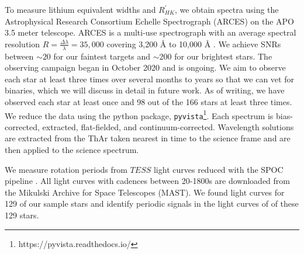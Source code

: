 
To measure lithium equivalent widths and $R^{'}_{HK}$, we obtain spectra using the Astrophysical Research Consortium Echelle Spectrograph (ARCES) on the APO 3.5 meter telescope. ARCES is a multi-use spectrograph with an average spectral resolution $R = \frac{\Delta\lambda}{\lambda} = 35,000$ covering 3,200 \r{A} to 10,000 \r{A} \citep{2003SPIE.4841.1145W}. We achieve SNRs between $\sim20$ for our faintest targets and $\sim200$ for our brightest stars.
The observing campaign began in October 2020 and is ongoing. We aim to observe each star at least three times over several months to years so that we can vet for binaries, which we will discuss in detail in future work. As of writing, we have observed each star at least once and 98 out of the 166 stars at least three times. We reduce the data using the python package, \texttt{pyvista}\footnote{https://pyvista.readthedocs.io/}. Each spectrum is bias-corrected, extracted, flat-fielded, and continuum-corrected. Wavelength solutions are extracted from the ThAr taken nearest in time to the science frame and are then applied to the science spectrum.  

We measure rotation periods from $TESS$ light curves reduced with the SPOC pipeline  \citep{2016SPIE.9913E..3EJ}. All light curves with cadences between 20-1800s are downloaded from the Mikulski Archive for Space Telescopes (MAST). We found light curves for 129 of our sample stars and identify periodic signals in the light curves of  of these 129 stars.